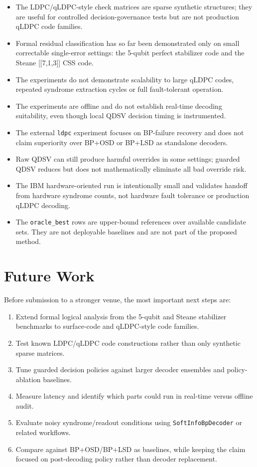 \documentclass[11pt]{article}
\begin{document}
\begin{itemize}[leftmargin=*]
\item The LDPC/qLDPC-style check matrices are sparse synthetic structures; they are useful for controlled decision-governance tests but are not production qLDPC code families.
\item Formal residual classification has so far been demonstrated only on small correctable single-error settings: the 5-qubit perfect stabilizer code and the Steane [[7,1,3]] CSS code.
\item The experiments do not demonstrate scalability to large qLDPC codes, repeated syndrome extraction cycles or full fault-tolerant operation.
\item The experiments are offline and do not establish real-time decoding suitability, even though local QDSV decision timing is instrumented.
\item The external \texttt{ldpc} experiment focuses on BP-failure recovery and does not claim superiority over BP+OSD or BP+LSD as standalone decoders.
\item Raw QDSV can still produce harmful overrides in some settings; guarded QDSV reduces but does not mathematically eliminate all bad override risk.
\item The IBM hardware-oriented run is intentionally small and validates handoff from hardware syndrome counts, not hardware fault tolerance or production qLDPC decoding.
\item The \texttt{oracle\_best} rows are upper-bound references over available candidate sets. They are not deployable baselines and are not part of the proposed method.
\end{itemize}

\section{Future Work}

Before submission to a stronger venue, the most important next steps are:


\begin{enumerate}[leftmargin=*]
\item Extend formal logical analysis from the 5-qubit and Steane stabilizer benchmarks to surface-code and qLDPC-style code families.
\item Test known LDPC/qLDPC code constructions rather than only synthetic sparse matrices.
\item Tune guarded decision policies against larger decoder ensembles and policy-ablation baselines.
\item Measure latency and identify which parts could run in real-time versus offline audit.
\item Evaluate noisy syndrome/readout conditions using \texttt{SoftInfoBpDecoder} or related workflows.
\item Compare against BP+OSD/BP+LSD as baselines, while keeping the claim focused on post-decoding policy rather than decoder replacement.
\end{enumerate}
\end{document}
